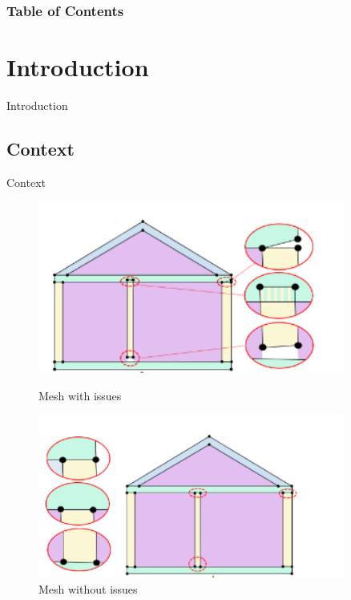 \documentclass[10pt]{beamer}
\begin{document}
\begin{frame}
    \frametitle{Table of Contents}
    \begin{multicols}{2} %
        \tableofcontents
    \end{multicols}
    \end{frame}


\section{Introduction}
\begin{frame}{Introduction}
\end{frame}

\subsection{Context}
\begin{frame}{Context}
\begin{figure}
    \begin{minipage}{0.45\textwidth}
    \includegraphics[width=0.9\textwidth]{../image/mesh_with_issue.png}
    \caption{Mesh with issues}
    
\end{minipage}
    \begin{minipage}{0.45\textwidth}
    \includegraphics[width=0.9\textwidth]{../image/mesh_fixed.png}
    \caption{Mesh without issues}
\end{minipage}
\end{figure}
\end{frame}
\end{document}

